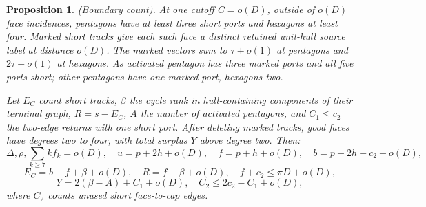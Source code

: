 \documentclass[10pt,reqno]{amsart}
\newtheorem{proposition}{Proposition}[section]
\begin{document}
\begin{proposition}
    (Boundary count). At one cutoff $C = o(D)$, outside of $o(D)$ face incidences, pentagons have at least three short ports and hexagons at least four. Marked short tracks give each such face a distinct retained unit-hull source label at distance $o(D)$. The marked vectors sum to $\tau + o(1)$ at pentagons and $2 \tau + o(1)$ at hexagons. As activated pentagon has three marked ports and all five ports short; other pentagons have one marked port, hexagons two.

    Let $E_C$ count short tracks, $\beta$ the cycle rank in hull-containing components of their terminal graph, $R = s - E_C$, $A$ the number of activated pentagons, and $C_1 \le c_2$ the two-edge returns with one short port. After deleting marked tracks, good faces have degrees two to four, with total surplus $Y$ above degree two. Then:
    \begin{equation}
        \Delta, \rho, \sum_{k\ge 7} k f_k = o(D), \quad u = p + 2h + o(D), \quad f = p + h + o(D), \quad b = p + 2h + c_2 + o(D),
    \end{equation}
    \begin{equation}
        E_C = b + f + \beta + o(D), \quad R = f - \beta + o(D), \quad f + c_2 \le \pi D + o(D),
    \end{equation}
    \begin{equation}
        Y = 2 (\beta - A) + C_1 + o(D), \quad C_2 \le 2c_2 - C_1 + o(D),
    \end{equation}
    where $C_2$ counts unused short face-to-cap edges.
\end{proposition}
\end{document}
